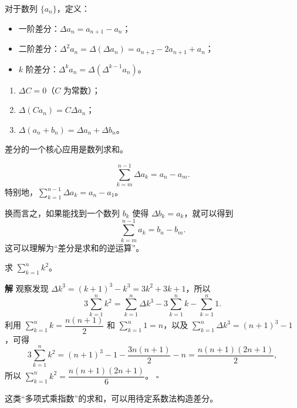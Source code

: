 \documentclass[fontset=fandol]{ctexart}
\newenvironment{solution}{\par\noindent\textbf{解}\quad}{\hfill$\square$\par\vspace{0.8em}}
\begin{document}
\begin{definition}[差分]
对于数列 \(\{a_n\}\)，定义：
\begin{itemize}
\item 一阶差分：\(\Delta a_n = a_{n+1} - a_n\)；
\item 二阶差分：\(\Delta^2 a_n = \Delta(\Delta a_n) = a_{n+2} - 2a_{n+1} + a_n\)；
\item \(k\) 阶差分：\(\Delta^k a_n = \Delta(\Delta^{k-1} a_n)\)。
\end{itemize}
\end{definition}

\begin{proposition}[差分的性质]
\begin{enumerate}
\item \(\Delta C = 0\)（\(C\) 为常数）；
\item \(\Delta(C a_n) = C \Delta a_n\)；
\item \(\Delta(a_n + b_n) = \Delta a_n + \Delta b_n\)。
\end{enumerate}
\end{proposition}

差分的一个核心应用是数列求和。

\begin{theorem}
\[
\sum _{k=m}^{n-1} \Delta a_k = a_n - a_m.
\]
特别地，\(\sum_{k=1}^{n-1} \Delta a_k = a_n - a_1\)。
\end{theorem}

换而言之，如果能找到一个数列 \(b_k\) 使得 \(\Delta b_k=a_k\)，就可以得到
\[
\sum_{k=m}^{n-1}a_k=b_n-b_m.
\]
这可以理解为“差分是求和的逆运算”。

\begin{example}[求自然数平方和]
求 \(\sum_{k=1}^n k^2\)。
\end{example}

\begin{solution}
观察发现 \(\Delta k^3 = (k+1)^3 - k^3 = 3k^2 + 3k + 1\)，所以
\[
3\sum_{k=1}^n k^2 = \sum_{k=1}^n \Delta k^3 - 3\sum_{k=1}^n k - \sum_{k=1}^n 1.
\]
利用 \(\sum_{k=1}^n  k = \dfrac{n(n+1)}{2}\) 和 \(\sum_{k=1}^n  1 = n\)，以及 \(\sum_{k=1}^n  \Delta k^3 = (n+1)^3 - 1\)，可得
\[
3\sum_{k=1}^n  k^2 = (n+1)^3 - 1 - \dfrac{3n(n+1)}{2} - n = \dfrac{n(n+1)(2n+1)}{2},
\]
所以 \(\sum_{k=1}^n k^2 = \dfrac{n(n+1)(2n+1)}{6}\)。
\end{solution}


\iffalse
\begin{example}[进阶：求 \(\sum_{k=1}^n k^2 \cdot 2^k\)]
这类“多项式乘指数”的求和，可以用待定系数法构造差分。
\end{example}
\end{document}
